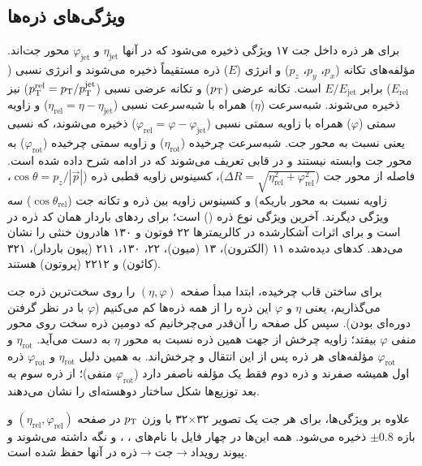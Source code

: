 \subsection{ویژگی‌های ذره‌ها}
برای هر ذره داخل جت ۱۷ ویژگی ذخیره می‌شود که در آنها $\eta_\mathrm{jet}$ و $\varphi_\mathrm{jet}$ محور جت‌اند. مؤلفه‌های تکانه ($p_x$، $p_y$، $p_z$) و انرژی ($E$) ذره مستقیماً ذخیره می‌شوند و انرژی نسبی ($E_\mathrm{rel}$) برابر $E/E_\mathrm{jet}$ است. تکانه عرضی ($p_\mathrm{T}$) و تکانه عرضی نسبی ($p_\mathrm{T}^\mathrm{rel}=p_\mathrm{T}/p_\mathrm{T}^\mathrm{jet}$) نیز ذخیره می‌شوند. شبه‌سرعت ($\eta$) همراه با شبه‌سرعت نسبی ($\eta_\mathrm{rel}=\eta-\eta_\mathrm{jet}$) و زاویه سمتی ($\varphi$) همراه با زاویه سمتی نسبی ($\varphi_\mathrm{rel}=\varphi-\varphi_\mathrm{jet}$) ذخیره می‌شوند، که نسبی یعنی نسبت به محور جت. شبه‌سرعت چرخیده ($\eta_\mathrm{rot}$) و زاویه سمتی چرخیده ($\varphi_\mathrm{rot}$) به محور جت وابسته نیستند و در قابی تعریف می‌شوند که در ادامه شرح داده شده است. فاصله از محور جت ($\Delta R=\sqrt{\eta_\mathrm{rel}^2+\varphi_\mathrm{rel}^2}$)، کسینوس زاویه قطبی ذره ($\cos\theta=p_z/|\vec p|$، زاویه نسبت به محور باریکه) و کسینوس زاویه بین ذره و تکانه جت ($\cos\theta_\mathrm{rel}$) سه ویژگی دیگرند. آخرین ویژگی نوع ذره () است؛ برای ردهای باردار همان کد ذره در  است و برای اثرات آشکارشده در کالریمترها ۲۲ فوتون و ۱۳۰ هادرون خنثی را نشان می‌دهد. کدهای دیده‌شده ۱۱ (الکترون)، ۱۳ (میون)، ۲۲، ۱۳۰، ۲۱۱ (پیون باردار)، ۳۲۱ (کائون) و ۲۲۱۲ (پروتون) هستند.

برای ساختن قاب چرخیده، ابتدا مبدأ صفحه $(\eta,\varphi)$ را روی سخت‌ترین ذره جت می‌گذاریم، یعنی $\eta$ و $\varphi$ این ذره را از همه ذره‌ها کم می‌کنیم ($\varphi$ با در نظر گرفتن دوره‌ای بودن). سپس کل صفحه را آن‌قدر می‌چرخانیم که دومین ذره سخت روی محور منفی $\varphi$ بیفتد؛ زاویه چرخش از جهت همین ذره نسبت به محور $\eta$ به دست می‌آید. $\eta_\mathrm{rot}$ و $\varphi_\mathrm{rot}$ مؤلفه‌های هر ذره پس از این انتقال و چرخش‌اند. به همین دلیل $\eta_\mathrm{rot}$ و $\varphi_\mathrm{rot}$ ذره اول همیشه صفرند و ذره دوم فقط یک مؤلفه ناصفر دارد ($\varphi_\mathrm{rot}$ منفی)؛ از ذره سوم به بعد توزیع‌ها شکل ساختار دو‌هسته‌ای را نشان می‌دهند.

علاوه بر ویژگی‌ها، برای هر جت یک تصویر ۳۲$\times$۳۲ با وزن $p_\mathrm{T}$ در صفحه $(\eta_\mathrm{rel},\varphi_\mathrm{rel})$ و بازه $\pm0.8$ ذخیره می‌شود. همه این‌ها در چهار فایل  با نام‌های ، ،  و  نگه داشته می‌شوند و پیوند رویداد$\to$جت$\to$ذره در آنها حفظ شده است.
